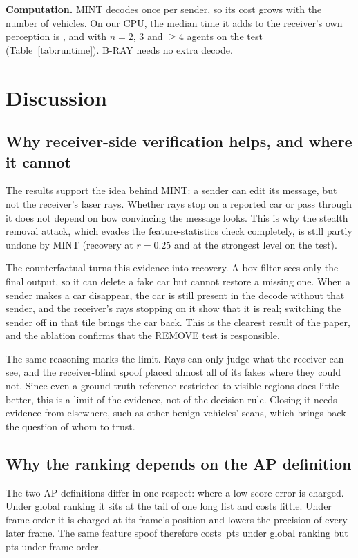 \documentclass[conference]{IEEEtran}
\newcommand{\mint}{MINT}
\newcommand{\pts}{\,pts}
\begin{document}
\textbf{Computation.} \mint{} decodes once per sender, so its cost grows with the number of vehicles. On our CPU,
the median time it adds to the receiver's own perception is \OvDenseTwoPfifty, \OvDenseThreePfifty{} and
\OvDenseFourPlusPfifty{} with $n=2$, $3$ and ${\ge}4$ agents on the test (Table~\ref{tab:runtime}). B-RAY needs
no extra decode.

\section{Discussion}
\label{sec:discussion}
\subsection{Why receiver-side verification helps, and where it cannot}
The results support the idea behind \mint: a sender can edit its message, but not the receiver's laser rays.
Whether rays stop on a reported car or pass through it does not depend on how convincing the message looks. This
is why the stealth removal attack, which evades the feature-statistics check completely, is still partly undone
by \mint{} (recovery \RecGlobPgdRemStMINT{} at $r=0.25$ and \RecGlobPgdRemStStrongMINT{} at the strongest level on
the test).

The counterfactual turns this evidence into recovery. A box filter sees only the final output, so it can delete a
fake car but cannot restore a missing one. When a sender makes a car disappear, the car is still present in the
decode without that sender, and the receiver's rays stopping on it show that it is real; switching the sender off
in that tile brings the car back. This is the clearest result of the paper, and the ablation confirms that the
REMOVE test is responsible.

The same reasoning marks the limit. Rays can only judge what the receiver can see, and the receiver-blind spoof
placed almost all of its fakes where they could not. Since even a ground-truth reference restricted to visible
regions does little better, this is a limit of the evidence, not of the decision rule. Closing it needs evidence
from elsewhere, such as other benign vehicles' scans, which brings back the question of whom to trust.

\subsection{Why the ranking depends on the AP definition}
The two AP definitions differ in one respect: where a low-score error is charged. Under global ranking it sits at
the tail of one long list and costs little. Under frame order it is charged at its frame's position and lowers the
precision of every later frame. The same feature spoof therefore costs \LossGlobSpoofFeat\pts{} under global
ranking but \LossFrameSpoofFeat\pts{} under frame order.
\end{document}
